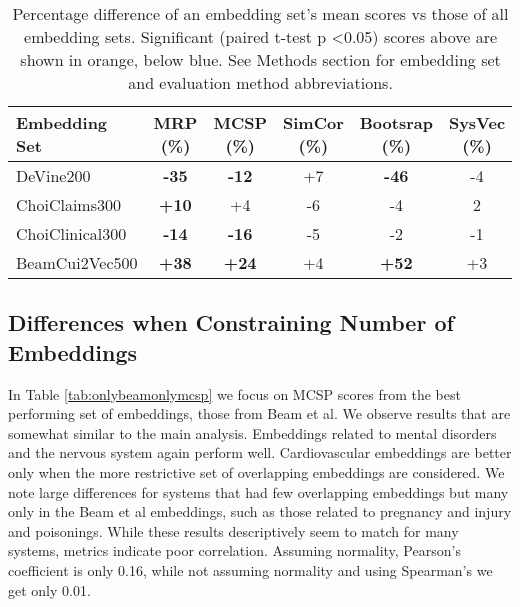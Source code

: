 \documentclass[10pt]{article}
\def\blu#1{{\textbf{\color{blu}#1}}}
\def\ora#1{{\textbf{\color{ora}#1}}}
\begin{document}
\begin{table*}[h]
	\begin{center}
	
	\label{tab:allembedresults}
	\begin{tabular}{l|c|c|c|c|c}
			            Embedding Set &MRP (\%)	        &MCSP (\%)	           &SimCor (\%)	    &Bootsrap (\%)	  &SysVec (\%)\\
			            \hline
		DeVine200       &\blu{-35}   &\blu{-12}	   &+7	    &\blu{-46} &	-4 \\
		ChoiClaims300   &\ora{+10}	& +4	           &-6	    &-4	      &2   \\
		ChoiClinical300	&\blu{-14}	&\blu{-16}	   &-5	    &-2	      &-1  \\
		BeamCui2Vec500	&\ora{+38}	&\ora{+24}	       &+4       &\ora{+52}  &+3   \\
	\end{tabular}
\caption{Percentage difference of an embedding set's mean scores vs those of all embedding sets. Significant (paired t-test p \textless 0.05) scores above are shown in orange, below blue. See Methods section for embedding set and evaluation method abbreviations.}
\end{center}
\end{table*}

\subsection{Differences when Constraining Number of Embeddings}

In Table \ref{tab:onlybeamonlymcsp} we focus on MCSP scores from the best performing set of embeddings, those from Beam et al. We observe results that are somewhat similar to the main  analysis. Embeddings related to mental disorders and the nervous system again perform well. Cardiovascular embeddings are better only when the more restrictive set of overlapping embeddings are considered. We note large differences for systems that had few overlapping embeddings but many only in the Beam et al embeddings, such as those related to pregnancy and injury and poisonings.  While these results descriptively seem to match for many systems, metrics indicate poor correlation. Assuming normality, Pearson's coefficient is only 0.16, while not assuming normality and using Spearman's we get only 0.01. 
\end{document}
